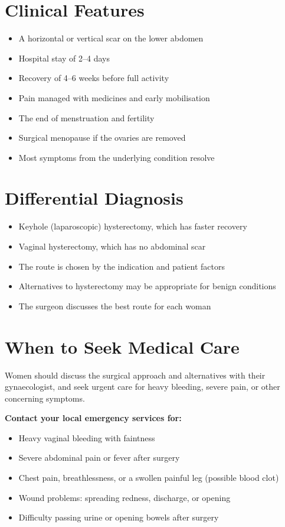 \section*{Clinical Features}
\begin{itemize}
    \item A horizontal or vertical scar on the lower abdomen
    \item Hospital stay of 2--4 days
    \item Recovery of 4--6 weeks before full activity
    \item Pain managed with medicines and early mobilisation
    \item The end of menstruation and fertility
    \item Surgical menopause if the ovaries are removed
    \item Most symptoms from the underlying condition resolve
\end{itemize}

\section*{Differential Diagnosis}
\begin{itemize}
    \item Keyhole (laparoscopic) hysterectomy, which has faster recovery
    \item Vaginal hysterectomy, which has no abdominal scar
    \item The route is chosen by the indication and patient factors
    \item Alternatives to hysterectomy may be appropriate for benign conditions
    \item The surgeon discusses the best route for each woman
\end{itemize}

\section*{When to Seek Medical Care}
Women should discuss the surgical approach and alternatives with their gynaecologist, and seek urgent care for heavy bleeding, severe pain, or other concerning symptoms.

\textbf{Contact your local emergency services for:}
\begin{itemize}
    \item Heavy vaginal bleeding with faintness
    \item Severe abdominal pain or fever after surgery
    \item Chest pain, breathlessness, or a swollen painful leg (possible blood clot)
    \item Wound problems: spreading redness, discharge, or opening
    \item Difficulty passing urine or opening bowels after surgery
\end{itemize}


